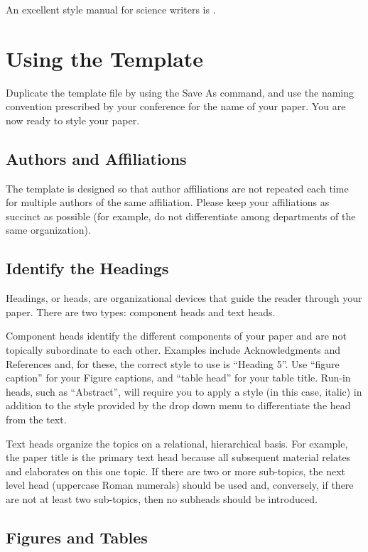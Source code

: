 \documentclass[conference,a4paper,flushend]{neutr}
\begin{document}
An excellent style manual for science writers is \cite{young2002technical}.

\section{Using the Template}
Duplicate the template file by using the Save As command, and use the naming convention prescribed by your conference for the name of your paper. You are now ready to style your paper.

\subsection{Authors and Affiliations}
The template is designed so that author affiliations are not repeated each time for multiple authors of the same affiliation. Please keep your affiliations as succinct as possible (for example, do not differentiate among departments of the same organization).

\subsection{Identify the Headings}
Headings, or heads, are organizational devices that guide the reader through your paper. There are two types: component heads and text heads.

Component heads identify the different components of your paper and are not topically subordinate to each other. Examples include Acknowledgments and References and, for these, the correct style to use is “Heading 5”. Use “figure caption” for your Figure captions, and “table head” for your table title. Run-in heads, such as “Abstract”, will require you to apply a style (in this case, italic) in addition to the style provided by the drop down menu to differentiate the head from the text.

Text heads organize the topics on a relational, hierarchical basis. For example, the paper title is the primary text head because all subsequent material relates and elaborates on this one topic. If there are two or more sub-topics, the next level head (uppercase Roman numerals) should be used and, conversely, if there are not at least two sub-topics, then no subheads should be introduced.

\subsection{Figures and Tables}
\end{document}
